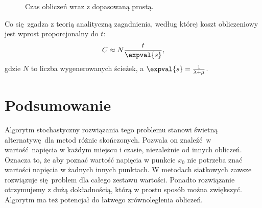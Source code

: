 \documentclass[a4paper, 12pt]{article}
\begin{document}
	\begin{figure}[H]
		\centering
		
		\caption{Czas obliczeń wraz z dopasowaną prostą.}
		\label{fig:times}
	\end{figure}
	
	\noaka Co się zgadza z teorią analityczną zagadnienia, według której koszt obliczeniowy jest wprost proporcjonalny do $t$:
	\begin{equation}
		C \approx N\frac{t}{\expval{s}},
	\end{equation}
	gdzie $N$ to liczba wygenerowanych ścieżek, a $\expval{s} = \frac{1}{\lambda + \mu}$. 
	
	\section*{Podsumowanie}
	
	Algorytm stochastyczny rozwiązania tego problemu stanowi świetną alternatywę dla metod różnic skończonych.
	Pozwala on znaleźć w wartość napięcia w każdym miejscu i czasie, niezależnie od innych obliczeń.
	Oznacza to, że aby poznać wartość napięcia w punkcie $x_0$ nie potrzeba znać wartości napięcia w żadnych innych punktach.
	W metodach siatkowych zawsze rozwiązuje się problem dla całego zestawu wartości.
	Ponadto rozwiązanie otrzymujemy z dużą dokładnością, którą w prostu sposób można zwiększyć.
	Algorytm ma też potencjał do łatwego zrównoleglenia obliczeń.
	
	
\end{document}
